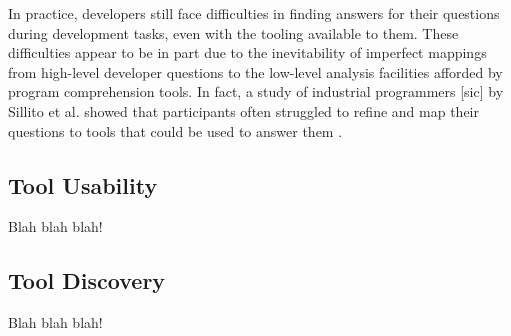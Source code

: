 \noindent In practice, developers still face difficulties in finding answers 
for their questions during development tasks, even with the tooling available 
to them.
These difficulties appear to be in part due to the inevitability of imperfect 
mappings from high-level developer questions to the low-level analysis 
facilities afforded by program comprehension tools.
In fact, a study of industrial programmers [sic] by Sillito et al. showed that 
participants often struggled to refine and map their questions to tools
that could be used to answer them \cite{sillito-2006-questions-during-task}.

\subsection{Tool Usability}
\label{subsec:ToolUsability}

Blah blah blah!

\subsection{Tool Discovery}
\label{subsec:ToolDiscovery}

Blah blah blah!

